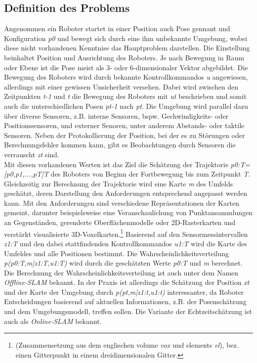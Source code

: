 \subsection{Definition des Problems}
Angenommen ein Roboter startet in einer Position auch Pose gennant und Konfiguration \textit{p0} und bewegt sich durch eine ihm 
unbekannte Umgebung, wobei diese nicht vorhandenen Kenntnise das Hauptproblem darstellen. Die Einstellung beinhaltet Position und Ausrichtung 
des Roboters. Je nach Bewegung in Raum oder Ebene ist die Pose meist als 3- oder 6-dimensionaler Vektor abgebildet. Die Bewegung des 
Roboters wird durch bekannte Kontrollkommandos \textit{u} angewiesen, allerdings mit einer gewissen Unsicherheit versehen. Dabei wird 
zwischen den Zeitpunkten \textit{t-1} und \textit{t} die Bewegung des Roboters mit \textit{ut} beschrieben und somit auch die 
unterschiedlichen Posen \textit{pt-1} nach \textit{pt}. Die Umgebung wird parallel dazu über diverse Sensoren, z.B. interne Sensoren, bspw. 
Gechwindigkeits- oder Positionssensoren, und externer Senoren, unter anderem Abstands- oder taktile Sensoren. Neben der Protokollierung der 
Position, bei der es zu Störungen oder Berechnungsfehler kommen kann, gibt es Beobachtungen durch Sensoren die verrauscht \textit{zt} sind.
\\ 
\linebreak
Mit diesen vorhandenen Werten ist das Ziel die Schätzung der Trajektorie \textit{p0:T=[p0,p1,...,pT]T} des Roboters von Beginn der 
Fortbewegung bis zum Zeitpunkt \textit{T}. Gleichzeitig zur Berechnung der Trajektorie wird eine Karte \textit{m} des Umfelds geschätzt, 
deren Darstellung den Anforderungen entsprechend angepasst werden kann. Mit den Anforderungen sind verschiedene Repräsentationen der Karten 
gemeint, darunter beispielsweise eine Veranschaulichung von Punktansammlungen an Gegenständen, gerenderte Oberflächenmodelle oder 
2D-Rasterkarten und verstärkt visualisierte 3D-Voxelkarten.\footnote{(Zusammensetzung aus dem englischen volume \textit{vox} und elements 
\textit{el}), bez. einen Gitterpunkt in einem dreidimensionalen Gitter.} Basierend auf den Sensormessintervallen \textit{z1:T} und den dabei
stattfindenden Kontrollkommandos \textit{u1:T} wird die Karte des Umfeldes und alle Positionen bestimmt. Die Wahrscheinlichkeitsverteilung 
\textit{p(p0:T,m|z1:T,u1:T)} wird durch die geschätzten Werte \textit{p0:T} und \textit{m} berechnet. 
\\ 
\linebreak
Die Berechnung der Wahrscheinlichkeitsverteilung ist auch unter dem Namen \textit{Offline-\acs{SLAM}} bekannt. In der Praxis ist allerdings 
die Schätzung der Position \textit{xt} und der Karte der Umgebung durch \textit{p(pt,m|z1:t,u1:t)} interessanter, da Roboter Entscheidungen 
basierend auf aktuellen Informationen, z.B. der Posenschätzung und dem Umgebungsmodell, treffen sollen. Die Variante der Echtzeitschätzung 
ist auch als \textit{Online-SLAM} bekannt. \cite{slamdefi.2016a}

